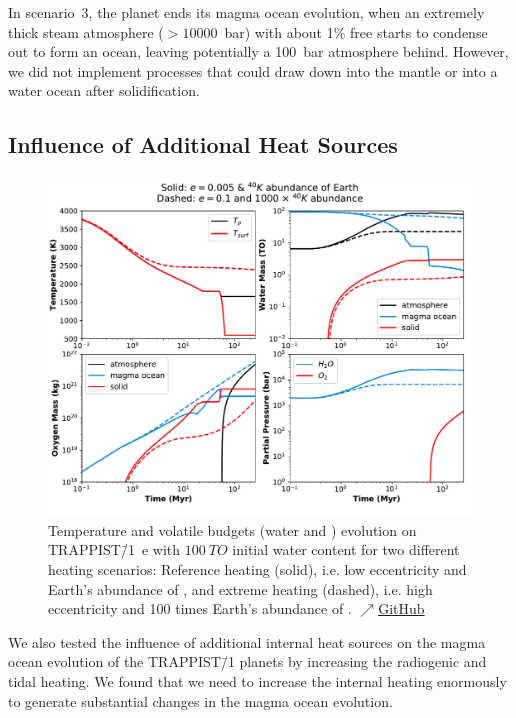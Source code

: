 \documentclass[oneside,twocolumn]{article}
\begin{document}
In scenario~3, the planet ends its magma ocean evolution, when an extremely thick steam atmosphere ($>10000$~bar) with about 1\% free  starts to condense out to form an ocean, leaving potentially a 100~bar  atmosphere behind. However, we did not implement processes that could draw down  into the mantle or into a water ocean after solidification.

\subsection{Influence of Additional Heat Sources}

\begin{figure}[ht]
    \centering
    \includegraphics[width=\textwidth]{BarthFig7.pdf}
    \caption{Temperature and volatile budgets (water and ) evolution on TRAPPIST\=/1~e with $\SI{100}{TO}$ initial water content for two different heating scenarios: Reference heating (solid), i.e. low eccentricity and Earth's abundance of , and extreme heating (dashed), i.e. high eccentricity and 100 times Earth's abundance of .
    \href{https://github.com/pbfeu/Trappist1_MagmOc/tree/public/Fig_Trappist1e_Compare_Heat}{$\nearrow$GitHub}
    }
    \label{TR1_fluxes_volatiles}%
\end{figure}

We also tested the influence of additional internal heat sources on the magma ocean evolution of the TRAPPIST\=/1 planets by increasing the radiogenic and tidal heating. 
We found that we need to increase the internal heating enormously to generate substantial changes in the magma ocean evolution. 
\end{document}

